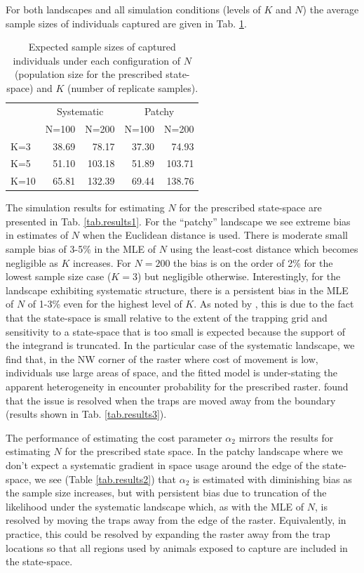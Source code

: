 For both landscapes and all simulation conditions (levels of $K$ and
$N$) the average sample sizes of individuals captured are given in
Tab. \ref{tab.samplesize}.
\begin{table}[h]
\centering
\caption{
Expected sample sizes of captured individuals under each configuration of
$N$ (population size for the prescribed state-space) and $K$ (number of replicate samples).
}
\begin{tabular}{l|rrrr}
 & \multicolumn{2}{c}{Systematic} & \multicolumn{2}{c}{Patchy}  \\
    & N=100 &  N=200  &   N=100 &  N=200  \\ \hline
K=3 &  38.69 &   78.17  &   37.30 &   74.93  \\
K=5 &  51.10 &  103.18  &   51.89 &  103.71 \\
K=10&  65.81 &  132.39  &   69.44 &  138.76 \\
\end{tabular}
\label{tab.samplesize}
\end{table}
The simulation results for estimating $N$
for the prescribed state-space are presented in Tab.
\ref{tab.results1}.  For the ``patchy'' landscape we see extreme
bias in estimates of $N$ when the Euclidean distance is used. There is
moderate small sample bias of 3-5\% in the MLE of $N$ using the
least-cost distance which becomes negligible as $K$ increases. For
$N=200$ the bias is on the order of 2\% for the lowest sample size
case ($K=3$) but negligible otherwise.  Interestingly, for the
landscape exhibiting systematic structure, there is a persistent bias
in the MLE of $N$ of 1-3\% even for the highest level of $K$.
As noted by \citet{royle_etal:2012ecol},
this is due to the fact that
the state-space is small relative to the extent of the trapping grid and
sensitivity to a state-space that is too small is expected because the
support of the integrand is truncated. In the particular case of the
systematic landscape, we find that, in the NW corner of the raster
where cost of movement is low, individuals use large areas of space,
and the fitted model is under-stating the apparent
heterogeneity in encounter probability for the prescribed raster.  \citet{royle_etal:2012ecol}
found that the issue is resolved when the traps are moved away from
the boundary (results shown in Tab. \ref{tab.results3}).

The performance of estimating the cost parameter $\alpha_{2}$ mirrors
the results for estimating $N$ for the prescribed state space. In the
patchy landscape where we don't expect a systematic gradient in space
usage around the edge of the state-space, we see
(Table \ref{tab.results2}) that $\alpha_{2}$ is estimated with
diminishing bias as the sample size increases, but with persistent
bias due to truncation of the likelihood under the systematic
landscape which, as with the MLE of $N$, is resolved by moving the
traps away from the edge of the raster. Equivalently, in practice,
this could be resolved by expanding the raster away from the trap
locations so that all regions used by animals exposed to capture are
included in the state-space.




